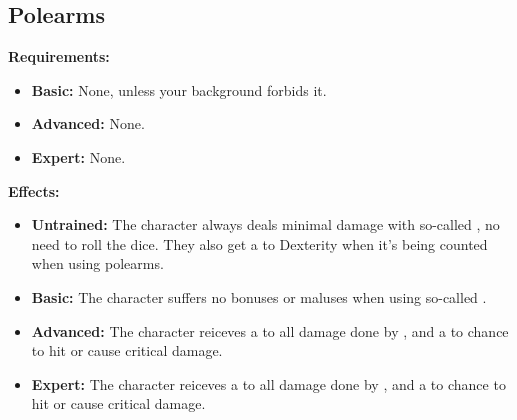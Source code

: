 \documentclass[openany,10pt,a4paper]{book}
\begin{document}
\subsection{Polearms}
\begin{table}[!ht]
\centering
{}
\end{table}
\textbf{Requirements:}
\begin{itemize}
	\item \textbf{Basic:} None, unless your background forbids it.
	\item \textbf{Advanced:} None.
	\item \textbf{Expert:} None.
\end{itemize}
\textbf{Effects:}
\begin{itemize}
	\item \textbf{Untrained:} The character always deals minimal damage with so-called  , no need to roll the dice. They also get a  to Dexterity when it's being counted when using polearms.
	\item \textbf{Basic:} The character suffers no bonuses or maluses when using so-called  .
	\item \textbf{Advanced:} The character reiceves a  to all damage done by  , and a  to chance to hit or cause critical damage.
	\item \textbf{Expert:} The character reiceves a  to all damage done by  , and a  to chance to hit or cause critical damage.
\end{itemize}\newpage
\end{document}
